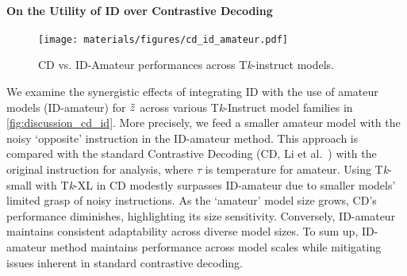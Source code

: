 \vspace{-6pt}
\paragraph{On the Utility of ID over Contrastive Decoding}
\label{sec:CD}
\begin{wrapfigure}{r}{0.4\textwidth}
    \vspace{-20pt}
    \texttt{[image: materials/figures/cd\_id\_amateur.pdf]}
    \vspace{-15pt}
    \caption{CD vs. ID-Amateur performances across T\textit{k}-instruct models.} 
    \label{fig:discussion_cd_id}
    \vspace{-20pt}
\end{wrapfigure}

We examine the synergistic effects of integrating ID with the use of amateur models (ID-amateur) for $\Tilde{z}$ across various T\textit{k}-Instruct model families in \autoref{fig:discussion_cd_id}. More precisely, we feed a smaller amateur model with the noisy `opposite' instruction in the ID-amateur method. This approach is compared with the standard Contrastive Decoding (CD, Li et al. \,\citep{contrastive_decoding}) with the original instruction for analysis, where \(\tau\) is temperature for amateur. Using T\textit{k}-small with T\textit{k}-XL in CD modestly surpasses ID-amateur due to smaller models' limited grasp of noisy instructions. As the `amateur' model size grows, CD's performance diminishes, highlighting its size sensitivity. Conversely, ID-amateur maintains consistent adaptability across diverse model sizes. To sum up, ID-amateur method maintains performance across model scales while mitigating issues inherent in standard contrastive decoding.
